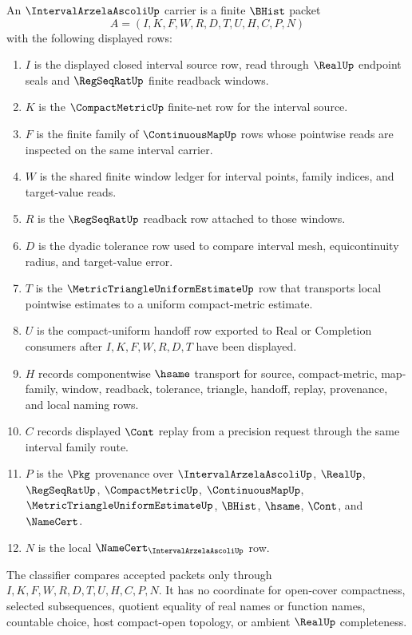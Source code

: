 \begin{definition}
\label{def:interval-arzela-ascoli-carrier}
An $\IntervalArzelaAscoliUp$ carrier is a finite $\BHist$ packet
$$
A=(I,K,F,W,R,D,T,U,H,C,P,N)
$$
with the following displayed rows:
\begin{enumerate}
\item $I$ is the displayed closed interval source row, read through $\RealUp$ endpoint seals and $\RegSeqRatUp$ finite readback windows.
\item $K$ is the $\CompactMetricUp$ finite-net row for the interval source.
\item $F$ is the finite family of $\ContinuousMapUp$ rows whose pointwise reads are inspected on the same interval carrier.
\item $W$ is the shared finite window ledger for interval points, family indices, and target-value reads.
\item $R$ is the $\RegSeqRatUp$ readback row attached to those windows.
\item $D$ is the dyadic tolerance row used to compare interval mesh, equicontinuity radius, and target-value error.
\item $T$ is the $\MetricTriangleUniformEstimateUp$ row that transports local pointwise estimates to a uniform compact-metric estimate.
\item $U$ is the compact-uniform handoff row exported to Real or Completion consumers after $I,K,F,W,R,D,T$ have been displayed.
\item $H$ records componentwise $\hsame$ transport for source, compact-metric, map-family, window, readback, tolerance, triangle, handoff, replay, provenance, and local naming rows.
\item $C$ records displayed $\Cont$ replay from a precision request through the same interval family route.
\item $P$ is the $\Pkg$ provenance over $\IntervalArzelaAscoliUp$, $\RealUp$, $\RegSeqRatUp$, $\CompactMetricUp$, $\ContinuousMapUp$, $\MetricTriangleUniformEstimateUp$, $\BHist$, $\hsame$, $\Cont$, and $\NameCert$.
\item $N$ is the local $\NameCert_{\IntervalArzelaAscoliUp}$ row.
\end{enumerate}
The classifier compares accepted packets only through $I,K,F,W,R,D,T,U,H,C,P,N$. It has no coordinate for open-cover compactness, selected subsequences, quotient equality of real names or function names, countable choice, host compact-open topology, or ambient $\RealUp$ completeness.
\end{definition}


